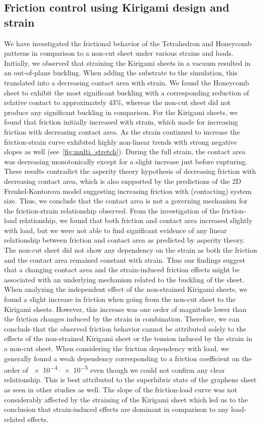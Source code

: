 \subsection{Friction control using Kirigami design and strain}
We have investigated the frictional behavior of the Tetrahedron and Honeycomb
patterns in comparison to a non-cut sheet under various strains and loads.
Initially, we observed that straining the Kirigami sheets in a vacuum resulted
in an out-of-plane buckling. When adding the substrate to the simulation, this
translated into a decreasing contact area with strain. We found the Honeycomb
sheet to exhibit the most significant buckling with a corresponding reduction of
relative contact to approximately 43\%, whereas the non-cut sheet did not
produce any significant buckling in comparison. For the Kirigami sheets, we
found that friction initially increased with strain, which made for increasing
friction with decreasing contact area. As the strain continued to increase the
friction-strain curve exhibited highly non-linear trends with strong negative
slopes as well (see~\cref{fig:multi_stretch}). During the full strain, the
contact area was decreasing monotonically except for a slight increase just
before rupturing. These results contradict the asperity theory hypothesis of
decreasing friction with decreasing contact area, which is also supported by the
predictions of the 2D Frenkel-Kontorova model suggesting increasing friction
with (contacting) system size. Thus, we conclude that the contact area is not a
governing mechanism for the friction-strain relationship observed. From the
investigation of the friction-load relationship, we found that both friction and
contact area increased slightly with load, but we were not able to find
significant evidence of any linear relationship between friction and contact
area as predicted by asperity theory. The non-cut sheet did not show any
dependency on the strain as both the friction and the contact area remained
constant with strain. Thus our findings suggest that a changing contact area and
the strain-induced friction effects might be associated with an underlying
mechanism related to the buckling of the sheet. When analyzing the independent
effect of the non-strained Kirigami sheets, we found a slight increase in
friction when going from the non-cut sheet to the Kirigami sheets. However, this
increase was one order of magnitude lower than the friction changes induced by
the strain in combination. Therefore, we can conclude that the observed friction
behavior cannot be attributed solely to the effects of the non-strained Kirigami
sheet or the tension induced by the strain in a non-cut sheet. When considering the friction dependency with load, we generally found a weak
dependency corresponding to a friction coefficient on the order of
\num{e-4}--\num{e-5} even though we could not confirm any clear relationship.
This is best attributed to the superlubric state of the graphene sheet as seen in
other studies as well. The slope of the friction-load curve was not considerably
affected by the straining of the Kirigami sheet which led us to the conclusion
that strain-induced effects are dominant in comparison to any load-related
effects. 


